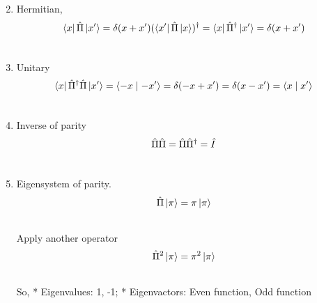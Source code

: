 \documentclass[letterpaper,10pt,english]{sphinxmanual}
\newcommand{\bra}[1]{\left\langle #1\right|}
\newcommand{\ket}[1]{\left| #1\right\rangle}
\newcommand{\braket}[2]{\langle #1 \mid #2 \rangle}
\begin{document}
\begin{enumerate}
\setcounter{enumi}{1}
\item {} 
Hermitian,
\begin{gather}
\begin{split}\bra{x}\hat \Pi \ket{x'} = \delta(x+x')
(\bra{x'}\hat \Pi \ket{x})^\dagger = \bra{x}\hat \Pi^\dagger \ket{x'} =\delta(x+x')\end{split}\notag\\\begin{split}\end{split}\notag
\end{gather}
\item {} 
Unitary
\begin{gather}
\begin{split}\bra{x}\hat \Pi^\dagger \hat \Pi \ket{x'}= \braket{-x}{-x'}=\delta(-x+x')=\delta(x-x')=\braket{x}{x'}\end{split}\notag\\\begin{split}\end{split}\notag
\end{gather}
\item {} 
Inverse of parity
\begin{gather}
\begin{split}\hat \Pi \hat \Pi = \hat \Pi \hat \Pi^\dagger = \hat I\end{split}\notag\\\begin{split}\end{split}\notag
\end{gather}
\item {} 
Eigensystem of parity.
\begin{gather}
\begin{split}\hat \Pi \ket{\pi}=\pi\ket{\pi}\end{split}\notag\\\begin{split}\end{split}\notag
\end{gather}
Apply another operator
\begin{gather}
\begin{split}\hat \Pi^2 \ket{\pi} = \pi^2 \ket{\pi}\end{split}\notag\\\begin{split}\end{split}\notag
\end{gather}
So,
* Eigenvalues: 1, -1;
* Eigenvactors: Even function, Odd function


\end{enumerate}
\end{document}
